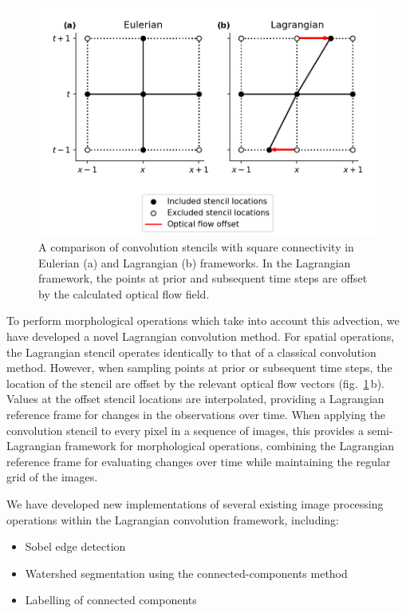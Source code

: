 \begin{figure}[t]
    \includegraphics[width=\textwidth]{figures/chapter1_15.png}
    \caption[
    A comparison of convolution stencils with square connectivity in Eulerian and Lagrangian frameworks.
    ]{
    A comparison of convolution stencils with square connectivity in Eulerian (a) and Lagrangian (b) frameworks. In the Lagrangian framework, the points at prior and subsequent time steps are offset by the calculated optical flow field.
    }
    \label{fig:convolution_kernels}
\end{figure}


To perform morphological operations which take into account this advection, we have developed a novel Lagrangian convolution method.
For spatial operations, the Lagrangian stencil operates identically to that of a classical convolution method.
However, when sampling points at prior or subsequent time steps, the location of the stencil are offset by the relevant optical flow vectors (fig.~\ref{fig:convolution_kernels}\,b).
Values at the offset stencil locations are interpolated, providing a Lagrangian reference frame for changes in the observations over time.
When applying the convolution stencil to every pixel in a sequence of images, this provides a semi-Lagrangian framework for morphological operations, combining the Lagrangian reference frame for evaluating changes over time while maintaining the regular grid of the images.

We have developed new implementations of several existing image processing operations within the Lagrangian convolution framework, including:
\begin{itemize}
    \item Sobel edge detection \citep{sobel_isotropic_2014}
    \item Watershed segmentation using the connected-components method \citep{bieniek_efficient_2000}
    \item Labelling of connected components \citep{hoshen_percolation_1976}
\end{itemize}

